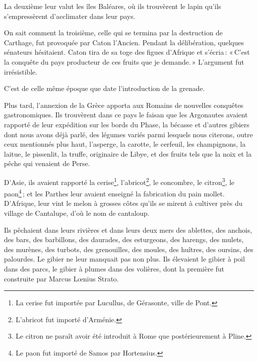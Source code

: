 La deuxième leur valut les îles Baléares, où ils trouvèrent le lapin qu'ils
s'empressèrent d'acclimater dans leur pays.

On sait comment la troisième, celle qui se termina par la destruction de
Carthage, fut provoquée par Caton l'Ancien. Pendant la délibération, quelques
sénateurs hésitaient. Caton tira de sa toge des figues d'Afrique et s'écria :
« C'est la conquête du pays producteur de ces fruits que je demande. »
L'argument fut irrésistible.

C'est de celle même époque que date l'introduction de la grenade.

Plus tard, l'annexion de la Grèce apporta aux Romains de nouvelles conquêtes
gastronomiques. Ils trouvèrent dans ce pays le faisan que les Argonautes
avaient rapporté de leur expédition sur les bords du Phase, la bécasse et
d'autres gibiers dont nous avons déjà parlé, des légumes variés parmi lesquels
nous citerons, outre ceux mentionnés plus haut, l'asperge, la carotte, le
cerfeuil, les champignons, la laitue, le pissenlit, la truffe, originaire de
Libye, et des fruits tels que la noix et la pêche qui venaient de Perse.

D'Asie, ils avaient rapporté la cerise\footnote{La cerise fut importée par
Lucullus, de Gérasonte, ville de Pont.}, l'abricot\footnote{L’abricot fut
importé d'Arménie.}, le concombre, le citron\footnote{Le citron ne paraît avoir
été introduit à Rome que postérieurement à Pline.}, le paon\footnote{Le paon
fut importé de Samos par Hortensius.} ; et les Parthes leur avaient enseigné la
fabrication du pain mollet. D'Afrique, leur vint le melon à grosses côtes
qu'ils se mirent à cultiver près du village de Cantalupe, d'où le nom de
cantaloup.

Ils pêchaient dans leurs rivières et dans leurs deux mers des ablettes, des
anchois, des bars, des barbillons, des daurades, des esturgeons, des harengs,
des mulets, des murènes, des turbots, des grenouilles, des moules, des huîtres,
des oursins, des palourdes. Le gibier ne leur manquait pas non plus. Ils élevaient
le gibier à poil dans des parcs, le gibier à plumes dans des volières, dont la
première fut construite par Marcus Lœnius Strato.

